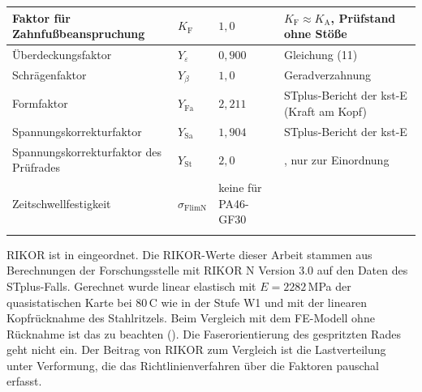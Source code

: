 \begin{table}[htbp]
\begin{tabular}{L{4.6cm}L{1.6cm}L{3.6cm}L{4.9cm}}
		\hline
		Faktor für Zahnfußbeanspruchung        & $K_{\mathrm{F}}$          & $1{,}0$                         & $K_{\mathrm{F}} \approx K_{\mathrm{A}}$, Prüfstand ohne Stöße \cite[S.~11]{VDI2736-2} \\
		\hline
		Überdeckungsfaktor                     & $Y_{\varepsilon}$         & $0{,}900$                       & Gleichung (11) \cite[S.~13]{VDI2736-2}                                                \\
		\hline
		Schrägenfaktor                         & $Y_{\beta}$               & $1{,}0$                         & Geradverzahnung \cite[S.~13]{VDI2736-2}                                               \\
		\hline
		Formfaktor                             & $Y_{\mathrm{Fa}}$         & $2{,}211$                       & STplus-Bericht der kst-E (Kraft am Kopf)                                              \\
		\hline
		Spannungskorrekturfaktor               & $Y_{\mathrm{Sa}}$         & $1{,}904$                       & STplus-Bericht der kst-E                                                              \\
		\hline
		Spannungskorrekturfaktor des Prüfrades & $Y_{\mathrm{St}}$         & $2{,}0$                         & \cite[S.~13]{VDI2736-2}, nur zur Einordnung                                           \\
		\hline
		Zeitschwellfestigkeit                  & $\sigma_{\mathrm{FlimN}}$ & keine für PA46-GF30             & \cite[S.~14]{VDI2736-2}                                                               \\
		\hline
	\end{tabular}
\end{table}



RIKOR ist in  eingeordnet. Die RIKOR-Werte dieser Arbeit stammen aus Berechnungen der Forschungsstelle mit RIKOR N Version 3.0 auf den Daten des STplus-Falls. Gerechnet wurde linear elastisch mit $E = 2282$\,MPa der quasistatischen Karte bei $80$\,\textdegree C wie in der Stufe W1 und mit der linearen Kopfrücknahme des Stahlritzels. Beim Vergleich mit dem FE-Modell ohne Rücknahme ist das zu beachten (). Die Faserorientierung des gespritzten Rades geht nicht ein. Der Beitrag von RIKOR zum Vergleich ist die Lastverteilung unter Verformung, die das Richtlinienverfahren über die Faktoren pauschal erfasst.

